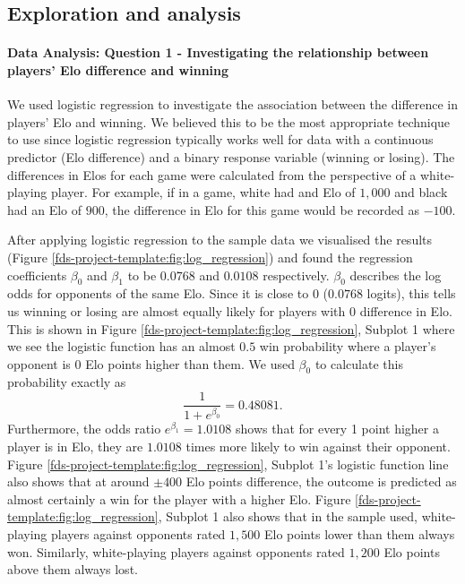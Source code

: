 \documentclass[10pt,a4paper]{article}
\begin{document}
\begin{multicols}{2}
\section{Exploration and  analysis}

\paragraph{Data Analysis: Question 1 - Investigating the relationship between players' Elo difference and winning}

We used logistic regression to investigate the association between the difference in players' Elo and winning. We believed this to be the most appropriate technique to use since logistic regression typically works well for data with a continuous predictor (Elo difference) and a binary response variable (winning or losing). The differences in Elos for each game were calculated from the perspective of a white-playing player. For example, if in a game, white had and Elo of $1,000$ and black had an Elo of $900$, the difference in Elo for this game would be recorded as $-100$. \newline

After applying logistic regression to the sample data we visualised the results (Figure \ref{fds-project-template:fig:log_regression}) and found the regression coefficients $\beta_{0}$ and $\beta_{1}$ to be $0.0768$ and $0.0108$ respectively. $\beta_{0}$ describes the log odds for opponents of the same Elo. Since it is close to $0$ ($0.0768$ logits), this tells us winning or losing are almost equally likely for players with $0$ difference in Elo. This is shown in Figure \ref{fds-project-template:fig:log_regression}, Subplot 1 where we see the logistic function has an almost $0.5$ win probability where a player's opponent is $0$ Elo points higher than them. We used $\beta_{0}$ to calculate this probability exactly as 
$$\displaystyle\frac{1}{1+e^{\beta_{0}}} = 0.48081.$$
Furthermore, the odds ratio $e^{\beta_{1}} = 1.0108$ shows that for every 1 point higher a player is in Elo, they are $1.0108$ times more likely to win against their opponent. Figure \ref{fds-project-template:fig:log_regression}, Subplot 1's logistic function line also shows that at around $\pm 400$ Elo points difference, the outcome is predicted as almost certainly a win for the player with a higher Elo. Figure \ref{fds-project-template:fig:log_regression}, Subplot 1 also shows that in the sample used, white-playing players against opponents rated $1,500$ Elo points lower than them always won. Similarly, white-playing players against opponents rated $1,200$ Elo points above them always lost. \newline


\end{multicols}
\end{document}
